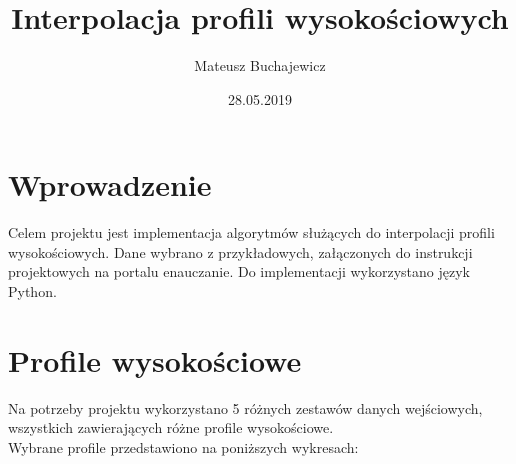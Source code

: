 \documentclass{article} %
\title{Interpolacja profili wysokościowych}
\date{28.05.2019}
\author{Mateusz Buchajewicz}
\begin{document}
\maketitle

\section{Wprowadzenie}
Celem projektu jest implementacja algorytmów służących do interpolacji profili wysokościowych.
Dane wybrano z przykładowych, załączonych do instrukcji projektowych na portalu enauczanie.
Do implementacji wykorzystano język Python.
\section{Profile wysokościowe}
Na potrzeby projektu wykorzystano 5 różnych zestawów danych wejściowych, wszystkich zawierających 
różne profile wysokościowe.\\
Wybrane profile przedstawiono na poniższych wykresach: 
\end{document}

